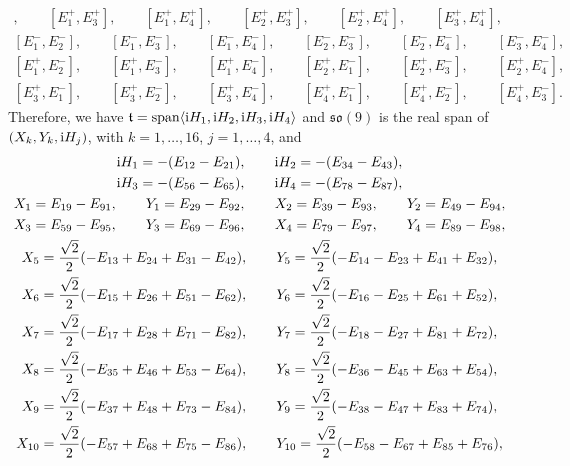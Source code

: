 \documentclass[10pt,a4paper]{amsart}
\numberwithin{equation}{section}
\begin{document}
\begin{Example}
\begin{gather*}
[E_1^+, E_2^+], \qquad [E_1^+, E_3^+], \qquad [E_1^+, E_4^+], \qquad [E_2^+, E_3^+], \qquad [E_2^+, E_4^+], \qquad [E_3^+, E_4^+],\\
[E_1^-, E_2^-], \qquad [E_1^-, E_3^-], \qquad [E_1^-, E_4^-], \qquad [E_2^-, E_3^-], \qquad [E_2^-, E_4^-], \qquad [E_3^-, E_4^-],\\
[E_1^+, E_2^-], \qquad [E_1^+, E_3^-], \qquad [E_1^+, E_4^-], \qquad [E_2^+, E_1^-], \qquad [E_2^+, E_3^-], \qquad [E_2^+, E_4^-], \\
 [E_3^+, E_1^-], \qquad [E_3^+, E_2^-], \qquad [E_3^+, E_4^-], \qquad [E_4^+, E_1^-], \qquad [E_4^+, E_2^-], \qquad [E_4^+, E_3^-].
\end{gather*}
Therefore, we have
$\mathfrak t = \operatorname{span}\langle {\rm i}H_1, {\rm i}H_2, {\rm i}H_3, {\rm i}H_4\rangle$ and ${\mathfrak{so}}(9)$ is the real span of $(X_k, Y_k, {\rm i}H_j)$, with $k = 1, \dots, 16$, $j = 1, \dots, 4$,
and
\begin{gather*}
 {\rm i}H_1 = - (E_{12} - E_{21}), \qquad {\rm i}H_2 = -(E_{34} - E_{43}),\\
 {\rm i}H_3 = - (E_{56} - E_{65}), \qquad {\rm i}H_4 =- (E_{78} - E_{87}),\\
 X_1 = E_{19} - E_{91}, \qquad Y_1 = E_{29} - E_{92}, \qquad X_2 = E_{39} - E_{93}, \qquad Y_2 = E_{49} - E_{94},\\
 X_3 = E_{59} - E_{95}, \qquad Y_3 = E_{69} - E_{96}, \qquad X_4 = E_{79} - E_{97}, \qquad Y_4 = E_{89} - E_{98},\\
 X_5 = \frac{\sqrt{2}}{2} (-E_{13} + E_{24} + E_{31} - E_{42}), \qquad Y_5 = \frac{\sqrt{2}}{2} (-E_{14} - E_{23} + E_{41} + E_{32}),\\
 X_6 = \frac{\sqrt{2}}{2} (-E_{15} + E_{26} + E_{51} - E_{62}), \qquad Y_6 = \frac{\sqrt{2}}{2} (-E_{16} - E_{25} + E_{61} + E_{52}),\\
 X_7 = \frac{\sqrt{2}}{2} (-E_{17} + E_{28} + E_{71} - E_{82}), \qquad Y_7 = \frac{\sqrt{2}}{2} (-E_{18} - E_{27} + E_{81} + E_{72}),\\
 X_8 = \frac{\sqrt{2}}{2} (-E_{35} + E_{46} + E_{53} - E_{64}), \qquad Y_8 = \frac{\sqrt{2}}{2} (-E_{36} - E_{45} + E_{63} + E_{54}),\\
 X_9 = \frac{\sqrt{2}}{2} (-E_{37} + E_{48} + E_{73} - E_{84}), \qquad Y_9 = \frac{\sqrt{2}}{2} (-E_{38} - E_{47} + E_{83} + E_{74}),\\
 X_{10} = \frac{\sqrt{2}}{2} (-E_{57} + E_{68} + E_{75} - E_{86}), \qquad Y_{10} = \frac{\sqrt{2}}{2} (-E_{58} - E_{67} + E_{85} + E_{76}),\\

\end{gather*}
\end{Example}
\end{document}
